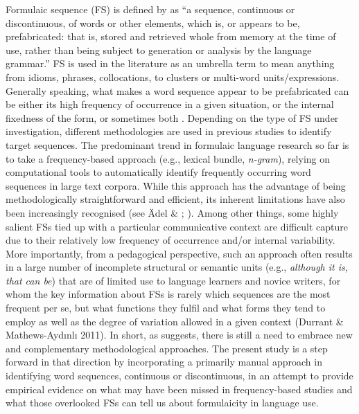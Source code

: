 Formulaic sequence (FS) is defined by \citet[9]{Wray2002} as “a sequence, continuous or discontinuous, of words or other elements, which is, or appears to be, prefabricated: that is, stored and retrieved whole from memory at the time of use, rather than being subject to generation or analysis by the language grammar.” FS is used in the literature as an umbrella term to mean anything from idioms, phrases, collocations, to clusters or multi-word units/expressions. Generally speaking, what makes a word sequence appear to be prefabricated can be either its high frequency of occurrence in a given situation, or the internal fixedness of the form, or sometimes both \citep{Siyanova-Chanturia2013}. Depending on the type of FS under investigation, different methodologies are used in previous studies to identify target sequences. The predominant trend in formulaic language research so far is to take a frequency-based approach (e.g., lexical bundle, \textit{n-gram}), relying on computational tools to automatically identify frequently occurring word sequences in large text corpora. While this approach has the advantage of being methodologically straightforward and efficient, its inherent limitations have also been increasingly recognised (see Ädel \& \citealt{Erman2012}; \citealt{Wang2018}). Among other things, some highly salient FSs tied up with a particular communicative context are difficult capture due to their relatively low frequency of occurrence and/or internal variability. More importantly, from a pedagogical perspective, such an approach often results in a large number of incomplete structural or semantic units (e.g., \textit{although it is, that can be}) that are of limited use to language learners and novice writers, for whom the key information about FSs is rarely which sequences are the most frequent per se, but what functions they fulfil and what forms they tend to employ as well as the degree of variation allowed in a given context (Durrant \& Mathews-Aydınlı 2011). In short, as \citet{Biber2009} suggests, there is still a need to embrace new and complementary methodological approaches. The present study is a step forward in that direction by incorporating a primarily manual approach in identifying word sequences, continuous or discontinuous, in an attempt to provide empirical evidence on what may have been missed in frequency-based studies and what those overlooked FSs can tell us about formulaicity in language use. 

